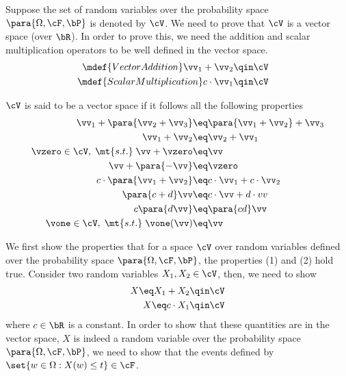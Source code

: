 \documentclass[a4paper,10pt]{article}
\begin{document}
\begin{question}

	Suppose the set of random variables over the probability space $\para{\Omega, \cF, \bP}$ is denoted by $\cV$.
	We need to prove that $\cV$ is a vector space (over $\bR$).
	In order to prove this, we need the addition and scalar multiplication operators to be well defined in the vector space.
	\begin{align}
		\mdef{Vector Addition}			\vv_1 + \vv_2	&\qin	\cV &\\
		\mdef{Scalar Multiplication}	c \cdot \vv_1	&\qin	\cV &
	\end{align}


	$\cV$ is said to be a vector space if it follows all the following properties
	\begin{align}
		\vv_1 + \para{\vv_2 + \vv_3}				&\eq	\para{\vv_1 + \vv_2} + \vv_3	\\
		\vv_1 + \vv_2								&\eq	\vv_2 + \vv_1					\\
		\vzero \in \cV,\; \mt{s.t.}\; \vv + \vzero	&\eq	\vv								\\
		\vv + \para{- \vv}							&\eq	\vzero							\\
		c \cdot \para{\vv_1 + \vv_2}				&\eq	c \cdot \vv_1 + c \cdot \vv_2	\\
		\para{c + d} \vv							&\eq	c \cdot \vv + d \cdot vv		\\
		c \para{d \vv}								&\eq	\para{c d} \vv					\\
		\vone \in \cV,\; \mt{s.t.}\; \vone (\vv)	&\eq	\vv
	\end{align}

	We first show the properties that for a space $\cV$ over random variables defined over the probability space $\para{\Omega, \cF, \bP}$, the properties (1) and (2) hold true.
	Consider two random variables $X_1, X_2 \in \cV$, then, we need to show
	\begin{align*}
		X	\eq	X_1 + X_2	&\qin	\cV \\
		X	\eq	c \cdot X_1	&\qin	\cV
	\end{align*}
	where $c \in \bR$ is a constant.
	In order to show that these quantities are in the vector space, \ie $X$ is indeed a random variable over the probability space $\para{\Omega, \cF, \bP}$, we need to show that the events defined by $\set{w \in \Omega : X(w) \le t} \in \cF$.


\end{question}
\end{document}

